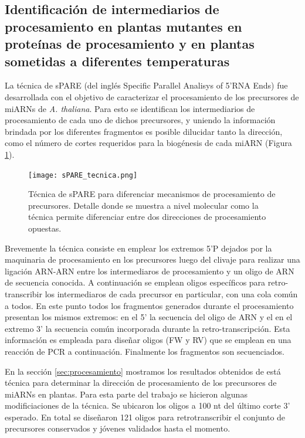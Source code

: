 \subsection{Identificación de intermediarios de procesamiento en plantas mutantes en proteínas de procesamiento y en plantas sometidas a diferentes temperaturas}

La técnica de sPARE (del inglés Specific Parallel Analisys of 5'RNA Ends) fue desarrollada con el objetivo de caracterizar el procesamiento de los precursores de miARNs de \textit{A. thaliana}.
Para esto se identifican los intermediarios de procesamiento de cada uno de dichos precursores, y uniendo la información brindada por los diferentes fragmentos es posible dilucidar tanto la dirección, como el número de cortes requeridos para la biogénesis de cada miARN (Figura \ref{fig:sPARE_tecnica}).

\begin{figure}[htbp!] 
	\centering    
	\texttt{[image: sPARE\_tecnica.png]}
	\caption[Técnica de sPARE]{Técnica de sPARE para diferenciar mecanismos de procesamiento de precursores.
	Detalle donde se muestra a nivel molecular como la técnica permite diferenciar entre dos direcciones de procesamiento opuestas. }
	 \label{fig:sPARE_tecnica}
\end{figure}

Brevemente la técnica consiste en emplear los extremos 5'P dejados por la maquinaria de procesamiento en los precursores luego del clivaje para realizar una ligación ARN-ARN entre los intermediaros de procesamiento y un oligo de ARN de secuencia conocida.
A continuación se emplean oligos específicos para retro-transcribir los intermediaros de cada precursor en particular, con una cola común a todos.
En este punto todos los fragmentos generados durante el procesamiento presentan los mismos extremos: en el 5' la secuencia del oligo de ARN y el en el extremo 3' la secuencia común incorporada durante la retro-transcripción.
Esta información es empleada para diseñar oligos (FW y RV) que se emplean en una reacción de PCR a continuación.
Finalmente los fragmentos son secuenciados. 

En la sección \ref{sec:procesamiento} mostramos los resultados obtenidos de está técnica para determinar la dirección de procesamiento de los precursores de miARNs en plantas.
Para esta parte del trabajo se hicieron algunas modificiaciones de la técnica. 
Se ubicaron los oligos a 100 nt del último corte 3' esperado.
En total se diseñaron 121 oligos para retrotranscribir el conjunto de precursores conservados y jóvenes validados hasta el momento.  

